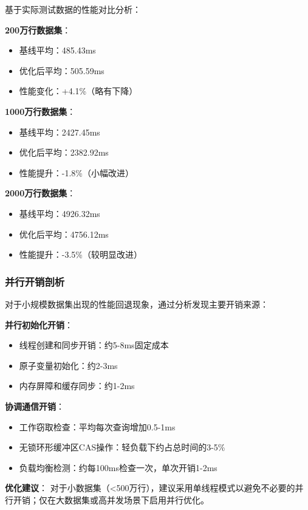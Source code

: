基于实际测试数据的性能对比分析：

\textbf{200万行数据集}：
\begin{itemize}
    \item 基线平均：485.43ms
    \item 优化后平均：505.59ms
    \item 性能变化：+4.1\%（略有下降）
\end{itemize}

\textbf{1000万行数据集}：
\begin{itemize}
    \item 基线平均：2427.45ms
    \item 优化后平均：2382.92ms
    \item 性能提升：-1.8\%（小幅改进）
\end{itemize}

\textbf{2000万行数据集}：
\begin{itemize}
    \item 基线平均：4926.32ms
    \item 优化后平均：4756.12ms
    \item 性能提升：-3.5\%（较明显改进）
\end{itemize}

\subsubsection{并行开销剖析}

对于小规模数据集出现的性能回退现象，通过分析发现主要开销来源：

\textbf{并行初始化开销}：
\begin{itemize}
    \item 线程创建和同步开销：约5-8ms固定成本
    \item 原子变量初始化：约2-3ms
    \item 内存屏障和缓存同步：约1-2ms
\end{itemize}

\textbf{协调通信开销}：
\begin{itemize}
    \item 工作窃取检查：平均每次查询增加0.5-1ms
    \item 无锁环形缓冲区CAS操作：轻负载下约占总时间的3-5\%
    \item 负载均衡检测：约每100ms检查一次，单次开销1-2ms
\end{itemize}

\textbf{优化建议}：
对于小数据集（<500万行），建议采用单线程模式以避免不必要的并行开销；仅在大数据集或高并发场景下启用并行优化。

